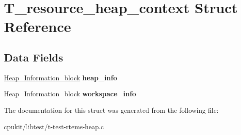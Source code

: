 \hypertarget{structT__resource__heap__context}{}\section{T\+\_\+resource\+\_\+heap\+\_\+context Struct Reference}
\label{structT__resource__heap__context}
\subsection*{Data Fields}
\begin{DoxyCompactItemize}
\item 
\mbox{\label{structT__resource__heap__context_a621dfbb86b91398be5f09640c14ef5bc}} 
\mbox{\hyperlink{structHeap__Information__block}{Heap\+\_\+\+Information\+\_\+block}} {\bfseries heap\+\_\+info}
\item 
\mbox{\label{structT__resource__heap__context_acc599cca1c01e62d6a27528a37db6be2}} 
\mbox{\hyperlink{structHeap__Information__block}{Heap\+\_\+\+Information\+\_\+block}} {\bfseries workspace\+\_\+info}
\end{DoxyCompactItemize}


The documentation for this struct was generated from the following file\+:\begin{DoxyCompactItemize}
\item 
cpukit/libtest/t-\/test-\/rtems-\/heap.\+c\end{DoxyCompactItemize}
